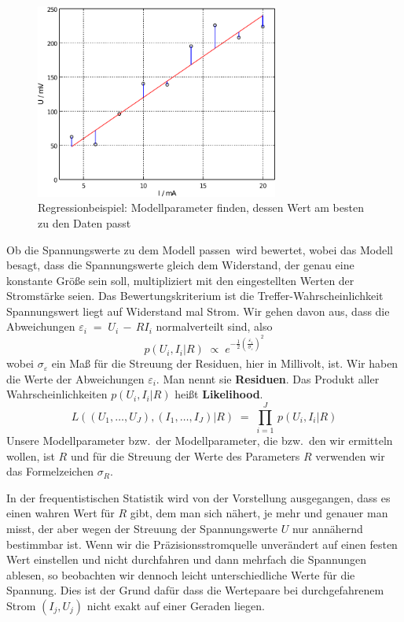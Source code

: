 \begin{figure}
\begin{center}
\includegraphics[width=80mm]{01_vorlesung/media/learn_estimation_ohm.pdf}
\caption{Regressionbeispiel: Modellparameter finden, dessen Wert am besten zu den Daten passt}
\label{Ohm1}
\end{center}
\end{figure}

Ob die Spannungswerte zu dem Modell \glqq passen\grqq ~wird bewertet, wobei das Modell
besagt, dass die Spannungswerte gleich dem Widerstand, der genau eine konstante Größe sein soll,
multipliziert mit den eingestellten Werten der Stromstärke seien. Das Bewertungskriterium ist
\glqq die Treffer-Wahrscheinlichkeit Spannungswert liegt auf Widerstand mal Strom\grqq.
Wir gehen davon aus, dass die Abweichungen $\varepsilon_i \; = \; U_i \, - \, R I_i$ normalverteilt sind, also
\begin{equation}
p(U_i,I_i | R) \; \propto \; e^{-\frac{1}{2} \left(\frac{\varepsilon_i}{\sigma_\varepsilon}\right)^2}
\end{equation}
wobei $\sigma_\varepsilon$ ein Maß für die Streuung der Residuen, hier in Millivolt, ist.
Wir haben die Werte der Abweichungen $\varepsilon_i$. Man nennt sie \textbf{Residuen}.
Das Produkt aller Wahrscheinlichkeiten $p(U_i,I_i | R)$ heißt \textbf{Likelihood}.
\begin{equation}
L((U_1,\dots, U_J), (I_1,\dots,I_J) | R) \; = \; \prod\limits_{i = 1}^J \, p(U_i,I_i | R)
\end{equation}
Unsere Modellparameter bzw.\ der Modellparameter, die bzw.\ den wir ermitteln wollen, ist $R$ und
für die Streuung der Werte des Parameters $R$ verwenden wir das Formelzeichen $\sigma_R$.

In der frequentistischen Statistik wird von der Vorstellung ausgegangen, dass es einen wahren Wert für
$R$ gibt, dem man sich nähert, je mehr und genauer man misst, der aber wegen der Streuung
der Spannungswerte $U$ nur annähernd bestimmbar ist. Wenn wir die Präzisionsstromquelle unverändert
auf einen festen Wert einstellen und nicht durchfahren und dann mehrfach die Spannungen ablesen, so
beobachten wir dennoch leicht unterschiedliche Werte für die Spannung. Dies ist der Grund dafür
dass die Wertepaare bei durchgefahrenem Strom $(I_j, U_j)$ nicht exakt auf einer Geraden liegen.

